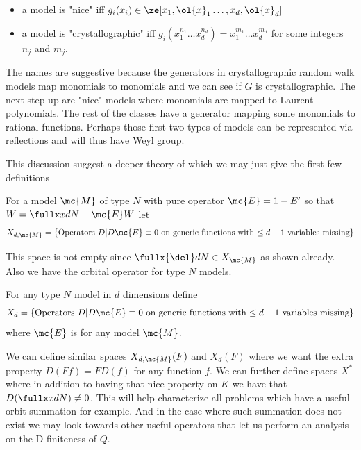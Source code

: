 \begin{itemize}
\item a model is "nice" iff $g_i(x_i) \in \ze[x_1,\ol{x}_1\ldots,x_d,\ol{x}_d]$
\item a model is "crystallographic" iff $g_i(x_1^{n_1}\ldots x_d^{n_d}) = x_1^{m_1}\ldots x_d^{m_d}$ for some integers $n_j$ and $m_j$.
\end{itemize}
The names are suggestive because the generators in crystallographic random walk models map monomials to monomials and we can see if $G$ is crystallographic. The next step up are "nice" models where monomials are mapped to Laurent polynomials. The rest of the classes have a generator mapping some monomials to rational functions. Perhaps those first two types of models can be represented via reflections and will thus have Weyl group.




This discussion suggest a deeper theory of which we may just give the first few definitions
\begin{definition} For a model $\mc{M}$ of type $N$ with pure operator $\mc{E} = 1- E'$ so that $W = \fullx xdN  +\mc{E}W$ let
\begin{align}
	X_{d,\mc{M}} = \{\text{Operators $D$}| D\mc{E} \equiv 0 \text{ on generic functions with $\leq d -1$ variables missing}\}
\end{align}
\end{definition}
This space is not empty since $\fullx{\del} dN \in X_{\mc{M}}$ as shown already. Also we have the orbital operator for type $N$ models.
\begin{definition} For any type $N$ model in $d$ dimensions define
\begin{align}
	X_d  = \{\text{Operators $D$}| D\mc{E} \equiv 0 \text{ on generic functions with $\leq d -1$ variables missing}\}
\end{align}
where $\mc{E}$ is for any model $\mc{M}$.
\end{definition}
We can define similar spaces $X_{d,\mc{M}}(F)$ and $X_d(F)$ where we want the extra property $D(Ff) = FD(f)$ for any function $f$. We can further define spaces $X^\ast$ where in addition to having that nice property on $K$ we have that $D(\fullx xdN) \neq 0$. This will help characterize all problems which have a useful orbit summation for example. And in the case where such summation does not exist we may look towards other useful operators that let us perform an analysis on the D-finiteness of $Q$.